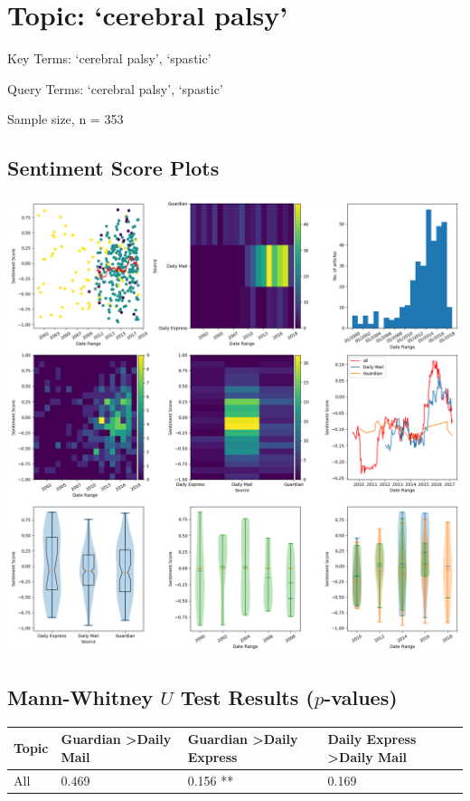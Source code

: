 \documentclass{report}
\begin{document}
\newpage
\section{Topic: `cerebral palsy'}
Key Terms: `cerebral palsy', `spastic'

\noindent Query Terms: `cerebral palsy', `spastic'

\noindent Sample size, n = 353

\subsection{Sentiment Score Plots}
\includegraphics[width=\textwidth]{raw/cerebral-palsy.png}

\subsection{Mann-Whitney $U$ Test Results ($p$-values)}
\noindent
\begin{tabu} to \textwidth { | X[c] | X[c] | X[c] | X[c] | }  
	\hline
	Topic & Guardian \textgreater\space Daily Mail & Guardian \textgreater\space Daily Express & Daily Express \textgreater\space Daily Mail  \\
	\hline
	All & 0.469 & 0.156 ** & 0.169  \\
	\hline
\end{tabu}
\end{document}
